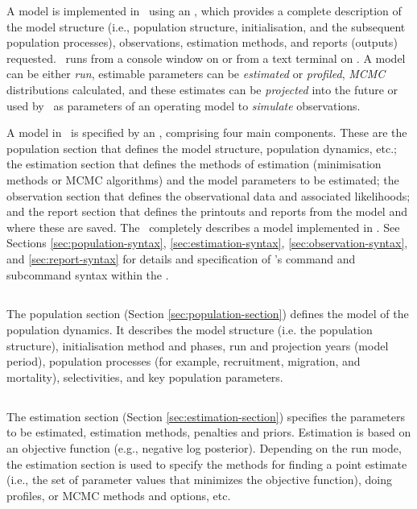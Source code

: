 A model is implemented in \CNAME\ using an \config {}, which provides a complete description of the model structure (i.e., population structure, initialisation, and the subsequent population processes), observations, estimation methods, and reports (outputs) requested. \CNAME\ runs from a console window on  or from a text terminal on . A model can be either \emph{run}, estimable parameters can be \emph{estimated} or \emph{profiled}, \emph{MCMC} distributions calculated, and these estimates can be \emph{projected} into the future or used by \CNAME\ as parameters of an operating model to \emph{simulate} observations.

A model in \CNAME\ is specified by an \config, comprising four main components. These are the population section that defines the model structure, population dynamics, etc.; the estimation section that defines the methods of estimation (minimisation methods or MCMC algorithms) and the model parameters to be estimated; the observation section that defines the observational data and associated likelihoods; and the report section that defines the printouts and reports from the model and where these are saved. The \config\ completely describes a model implemented in \CNAME. See Sections \ref{sec:population-syntax}, \ref{sec:estimation-syntax}, \ref{sec:observation-syntax}, and \ref{sec:report-syntax} for details and specification of \CNAME 's command and subcommand syntax within the \config. 

\subsection{}

The population section (Section \ref{sec:population-section}) defines the model of the population dynamics. It describes the model structure (i.e. the population structure), initialisation method and phases, run and projection years (model period), population processes (for example, recruitment, migration, and mortality), selectivities, and key population parameters.

\subsection{}

The estimation section (Section \ref{sec:estimation-section}) specifies the parameters to be estimated, estimation methods, penalties and priors. Estimation is based on an objective function (e.g., negative log posterior). Depending on the run mode, the estimation section is used to specify the methods for finding a point estimate (i.e., the set of parameter values that minimizes the objective function), doing profiles, or MCMC methods and options, etc.

